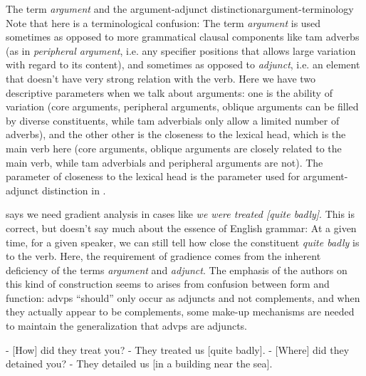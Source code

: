 \documentclass[UTF8, a4paper, oneside, scheme=plain, 12pt]{ctexbook}
\newcommand*{\citepage}[1]{p.~{#1}}
\newcommand*{\term}[1]{\emph{#1}}
\newcommand{\form}[1]{\emph{#1}}
\begin{document}
\begin{infobox}{The term \term{argument} and the argument-adjunct distinction}{argument-terminology}
    Note that here is a terminological confusion:
    The term \term{argument} is used sometimes 
    as opposed to more grammatical clausal components like \acs{tam} adverbs
    (as in \term{peripheral argument}, 
    i.e. any specifier positions that allows large variation with regard to its content),
    and sometimes as opposed to \term{adjunct},
    i.e. an element that doesn't have very strong relation with the verb.
    Here we have two descriptive parameters when we talk about arguments:
    one is the ability of variation
    (core arguments, peripheral arguments, oblique arguments can be filled by diverse constituents,
    while \acs{tam} adverbials only allow a limited number of adverbs),
    and the other other is the closeness to the lexical head, which is the main verb here 
    (core arguments, oblique arguments are closely related to the main verb,
    while \acs{tam} adverbials and peripheral arguments are not).
    The parameter of closeness to the lexical head is the parameter used for argument-adjunct distinction
    in .

    \citet[\citepage{732}]{quirk1985} says we need gradient analysis 
    in cases like \form{we were treated [quite badly]}.
    This is correct, but doesn't say much about the essence of English grammar:
    At a given time, for a given speaker,
    we can still tell how close the constituent \form{quite badly} is to the verb.
    Here, the requirement of gradience 
    comes from the inherent deficiency of the terms \term{argument} and \term{adjunct}. 
    The emphasis of the authors on this kind of construction 
    seems to arises from confusion between form and function:
    \acs{advp}s ``should'' only occur as adjuncts and not complements,
    and when they actually appear to be complements,
    some make-up mechanisms are needed to maintain the generalization that \acs{advp}s are adjuncts.
\end{infobox}






\begin{exe}
    \ex\label{ex:simple-clause.dependents.ex-1} - [How] did they treat you? - They treated us [quite badly].
    \ex\label{ex:simple-clause.dependents.ex-2} - [Where] did they detained you? - They detailed us [in a building near the sea].
\end{exe}
\end{document}
